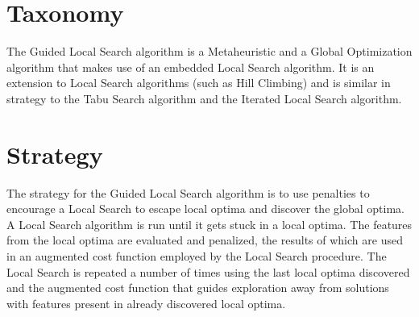 \documentclass[a4paper, 11pt]{article}
\begin{document}
\section{Taxonomy}
\label{sec:taxonomy}
The Guided Local Search algorithm is a Metaheuristic and a Global Optimization algorithm that makes use of an embedded Local Search algorithm.
It is an extension to Local Search algorithms (such as Hill Climbing) and is similar in strategy to the Tabu Search algorithm and the Iterated Local Search algorithm.

\section{Strategy}
\label{sec:strategy}
The strategy for the Guided Local Search algorithm is to use penalties to encourage a Local Search to escape local optima and discover the global optima.
A Local Search algorithm is run until it gets stuck in a local optima. The features from the local optima are evaluated and penalized, the results of which are used in an augmented cost function employed by the Local Search procedure. The Local Search is repeated a number of times using the last local optima discovered and the augmented cost function that guides exploration away from solutions with features present in already discovered local optima.


\end{document}
